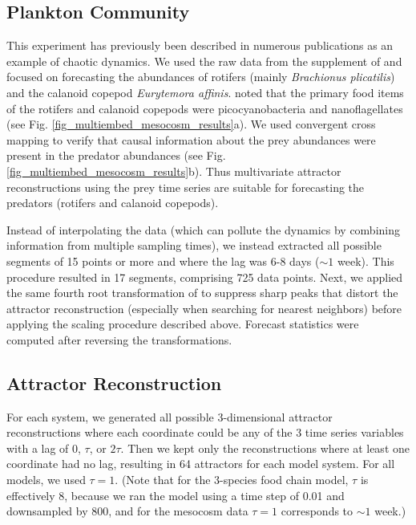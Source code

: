 \subsection{Plankton Community}

This experiment has previously been described in numerous publications as an example of chaotic dynamics. We used the raw data from the supplement of \cite{Beninca_2009} and focused on forecasting the abundances of rotifers (mainly \emph{Brachionus plicatilis}) and the calanoid copepod \emph{Eurytemora affinis}. \cite{Beninca_2009} noted that the primary food items of the rotifers and calanoid copepods were picocyanobacteria and nanoflagellates (see Fig. \ref{fig_multiembed_mesocosm_results}a). We used convergent cross mapping \cite{Sugihara_2012} to verify that causal information about the prey abundances were present in the predator abundances (see Fig. \ref{fig_multiembed_mesocosm_results}b). Thus multivariate attractor reconstructions using the prey time series are suitable for forecasting the predators (rotifers and calanoid copepods).

Instead of interpolating the data (which can pollute the dynamics by combining information from multiple sampling times), we instead extracted all possible segments of 15 points or more and where the lag was 6-8 days ($\sim 1$ week). This procedure resulted in 17 segments, comprising 725 data points. Next, we applied the same fourth root transformation of \cite{Beninca_2009} to suppress sharp peaks that distort the attractor reconstruction (especially when searching for nearest neighbors) before applying the scaling procedure described above. Forecast statistics were computed after reversing the transformations.

\subsection{Attractor Reconstruction}

For each system, we generated all possible 3-dimensional attractor reconstructions where each coordinate could be any of the 3 time series variables with a lag of 0, $\tau$, or $2\tau$. Then we kept only the reconstructions where at least one coordinate had no lag, resulting in 64 attractors for each model system. For all models, we used $\tau = 1$. (Note that for the 3-species food chain model, $\tau$ is effectively 8, because we ran the model using a time step of 0.01 and downsampled by 800, and for the mesocosm data $\tau = 1$ corresponds to $\sim 1$ week.)

